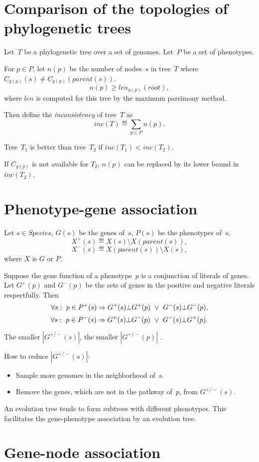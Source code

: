 \documentclass[10pt,a4paper]{article}
\theoremstyle{plain} \newtheorem{Lem}{Lemma}
\begin{document}
\section {Comparison of the topologies of phylogenetic trees}
Let~$T$ be a phylogenetic tree over a set of genomes.
Let~$P$ be a set of phenotypes.

For $p \in P$, let $n(p)$ be the number of nodes~$s$ in tree~$T$ where $C_{g(p)}(s) \ne C_{g(p)}(parent(s))$.
$$ n(p) \ge len_{g(p)}(root), $$
where $len$ is computed for this tree by the maximum parsimony method.

Then define the {\em inconsistency} of tree~$T$ as
$$ inc(T) \eqdef \sum_{p \in P} n(p). $$

Tree~$T_1$ is better than tree~$T_2$ if $inc(T_1) < inc(T_2)$.

If $C_{g(p)}$ is not available for $T_2$, $n(p)$ can be replaced by its lower bound in $inc(T_2)$.


\section {Phenotype-gene association}

Let $s \in Species$,
$G(s)$ be the genes of~$s$,
$P(s)$ be the phenotypes of~$s$,
$$ X^+(s) \eqdef X(s) \setminus X(parent(s)), $$
$$ X^-(s) \eqdef X(parent(s)) \setminus X(s), $$
where $X$ is $G$ or $P$.

Suppose the gene function of a phenotype~$p$ is a conjunction of literals of genes.
Let $G^+(p)$ and $G^-(p)$ be the sets of genes in the positive and negative literals respectfully.
Then
$$ \forall s: \ p \in P^+(s) \Rightarrow G^+(s) \bot G^+(p) \ \vee \  G^-(s) \bot G^-(p), $$
$$ \forall s: \ p \in P^-(s) \Rightarrow G^+(s) \bot G^-(p) \ \vee \  G^-(s) \bot G^+(p). $$

The smaller $|G^{+/-}(s)|$, the smaller $|G^{+/-}(p)|$ .

How to reduce $|G^{+/-}(s)|$:
\begin{itemize}
  \item Sample more genomes in the neighborhood of~$s$.
  \item Remove the genes, which are not in the pathway of~$p$, from $G^{+/-}(s)$.
\end{itemize}

\comm {}
An evolution tree tends to form subtrees with different phenotypes.
This facilitates the gene-phenotype association by an evolution tree.


\section {Gene-node association}
\end{document}
